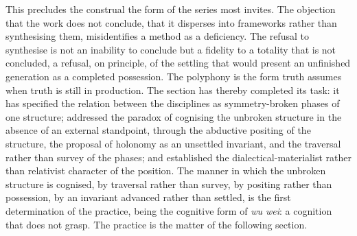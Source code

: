 \noindent
This precludes the construal the form of the series most invites. The objection that the work does not conclude, that it disperses into frameworks rather than synthesising them, misidentifies a method as a deficiency. The refusal to synthesise is not an inability to conclude but a fidelity to a totality that is not concluded, a refusal, on principle, of the settling that would present an unfinished generation as a completed possession. The polyphony is the form truth assumes when truth is still in production. The section has thereby completed its task: it has specified the relation between the disciplines as symmetry-broken phases of one structure; addressed the paradox of cognising the unbroken structure in the absence of an external standpoint, through the abductive positing of the structure, the proposal of holonomy as an unsettled invariant, and the traversal rather than survey of the phases; and established the dialectical-materialist rather than relativist character of the position. The manner in which the unbroken structure is cognised, by traversal rather than survey, by positing rather than possession, by an invariant advanced rather than settled, is the first determination of the practice, being the cognitive form of \emph{wu wei}: a cognition that does not grasp. The practice is the matter of the following section.
